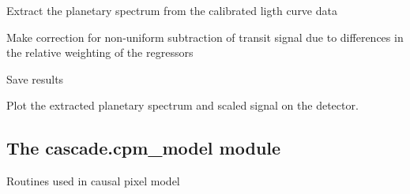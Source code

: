 \documentclass[a4paper,11pt,english]{sphinxmanual}
\begin{document}
\begin{fulllineitems}
\begin{fulllineitems}
\label{\detokenize{cascade.TSO:cascade.TSO.TSO.TSOSuite.extract_spectrum}}
Extract the planetary spectrum from the calibrated ligth curve data

\end{fulllineitems}


\begin{fulllineitems}
\label{\detokenize{cascade.TSO:cascade.TSO.TSO.TSOSuite.correct_extracted_spectrum}}
Make correction for non-uniform subtraction of transit signal due to
differences in the relative weighting of the regressors

\end{fulllineitems}


\begin{fulllineitems}
\label{\detokenize{cascade.TSO:cascade.TSO.TSO.TSOSuite.save_results}}
Save results

\end{fulllineitems}


\begin{fulllineitems}
\label{\detokenize{cascade.TSO:cascade.TSO.TSO.TSOSuite.plot_results}}
Plot the extracted planetary spectrum and scaled signal on the
detector.

\end{fulllineitems}


\end{fulllineitems}



\subsection{The cascade.cpm\_model module}
\label{\detokenize{cascade.cpm_model:module-cascade.cpm_model.cpm_model}}\label{\detokenize{cascade.cpm_model:the-cascade-cpm-model-module}}\label{\detokenize{cascade.cpm_model::doc}}
Routines used in causal pixel model
\end{document}

